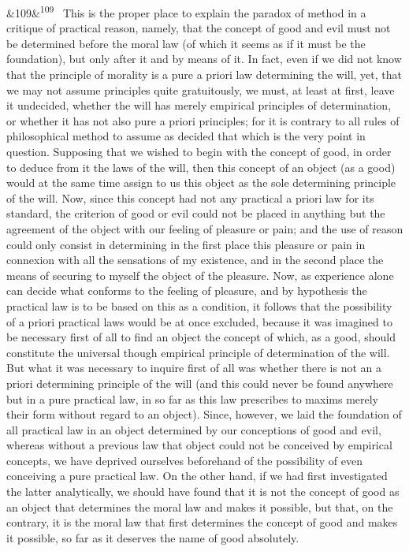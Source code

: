 \documentclass[12pt]{article}
\newcommand{\para}[1][]{\par\noindent\ifx&#1&\else\textsuperscript{\footnotesize #1}~\fi}
\begin{document}
\para[109] This is the proper place to explain the paradox of method in a critique of practical reason, namely, that the concept of good and evil must not be determined before the moral law (of which it seems as if it must be the foundation), but only after it and by means of it. In fact, even if we did not know that the principle of morality is a pure a priori law determining the will, yet, that we may not assume principles quite gratuitously, we must, at least at first, leave it undecided, whether the will has merely empirical principles of determination, or whether it has not also pure a priori principles; for it is contrary to all rules of philosophical method to assume as decided that which is the very point in question. Supposing that we wished to begin with the concept of good, in order to deduce from it the laws of the will, then this concept of an object (as a good) would at the same time assign to us this object as the sole determining principle of the will. Now, since this concept had not any practical a priori law for its standard, the criterion of good or evil could not be placed in anything but the agreement of the object with our feeling of pleasure or pain; and the use of reason could only consist in determining in the first place this pleasure or pain in connexion with all the sensations of my existence, and in the second place the means of securing to myself the object of the pleasure. Now, as experience alone can decide what conforms to the feeling of pleasure, and by hypothesis the practical law is to be based on this as a condition, it follows that the possibility of a priori practical laws would be at once excluded, because it was imagined to be necessary first of all to find an object the concept of which, as a good, should constitute the universal though empirical principle of determination of the will. But what it was necessary to inquire first of all was whether there is not an a priori determining principle of the will (and this could never be found anywhere but in a pure practical law, in so far as this law prescribes to maxims merely their form without regard to an object). Since, however, we laid the foundation of all practical law in an object determined by our conceptions of good and evil, whereas without a previous law that object could not be conceived by empirical concepts, we have deprived ourselves beforehand of the possibility of even conceiving a pure practical law. On the other hand, if we had first investigated the latter analytically, we should have found that it is not the concept of good as an object that determines the moral law and makes it possible, but that, on the contrary, it is the moral law that first determines the concept of good and makes it possible, so far as it deserves the name of good absolutely.
\end{document}
